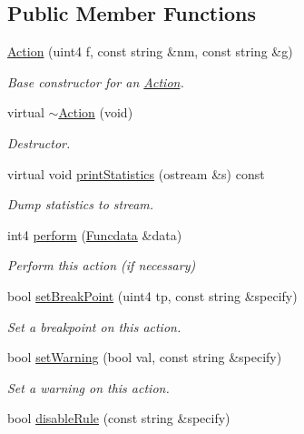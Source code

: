 \subsection*{Public Member Functions}
\begin{DoxyCompactItemize}
\item 
\mbox{\hyperlink{class_action_ae1999c2a392e2d6f3db563ea39f2b847}{Action}} (uint4 f, const string \&nm, const string \&g)
\begin{DoxyCompactList}\small\item\em Base constructor for an \mbox{\hyperlink{class_action}{Action}}. \end{DoxyCompactList}\item 
virtual \mbox{\hyperlink{class_action_a96ce796816ff45b892efe6820196fbf0}{$\sim$\+Action}} (void)
\begin{DoxyCompactList}\small\item\em Destructor. \end{DoxyCompactList}\item 
virtual void \mbox{\hyperlink{class_action_a57e38931fcb3bf9dffac2946d5e790be}{print\+Statistics}} (ostream \&s) const
\begin{DoxyCompactList}\small\item\em Dump statistics to stream. \end{DoxyCompactList}\item 
int4 \mbox{\hyperlink{class_action_a44042367ad3fd93c6dba73a41a047c5c}{perform}} (\mbox{\hyperlink{class_funcdata}{Funcdata}} \&data)
\begin{DoxyCompactList}\small\item\em Perform this action (if necessary) \end{DoxyCompactList}\item 
bool \mbox{\hyperlink{class_action_a52b3b4ed8ffd52be1b2d6b64c81f26a4}{set\+Break\+Point}} (uint4 tp, const string \&specify)
\begin{DoxyCompactList}\small\item\em Set a breakpoint on this action. \end{DoxyCompactList}\item 
bool \mbox{\hyperlink{class_action_ad9b48eafb7c921a0365e78561aca3f13}{set\+Warning}} (bool val, const string \&specify)
\begin{DoxyCompactList}\small\item\em Set a warning on this action. \end{DoxyCompactList}\item 
bool \mbox{\hyperlink{class_action_a3409170bddedb8af0b3ac88fabb78642}{disable\+Rule}} (const string \&specify)

\end{DoxyCompactItemize}
